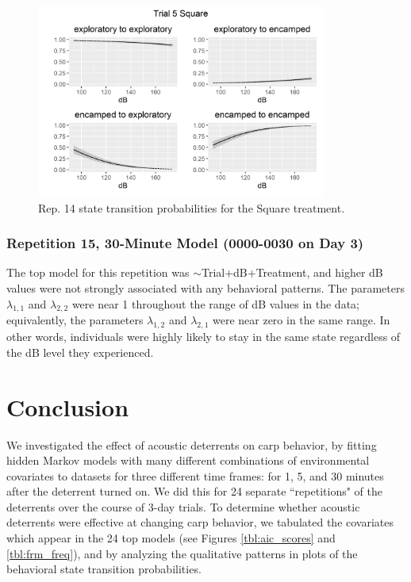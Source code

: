 \documentclass[12pt]{article}
\begin{document}
			\begin{figure}
				\centering
				\includegraphics[width=0.85\textwidth]{trans_rep_14_trial_5_Square.png}
				\caption{Rep. 14 state transition probabilities for the Square treatment.}
				\label{img:rep5_30min_trans_tmnt}
			\end{figure}
		
		\subsubsection{Repetition 15, 30-Minute Model (0000-0030 on Day 3)}
		
		The top model for this repetition was $\sim$Trial+dB+Treatment, and higher dB values were not strongly associated with any behavioral patterns. The parameters $\lambda_{1, 1}$ and $\lambda_{2, 2}$ were near 1 throughout the range of dB values in the data; equivalently, the parameters $\lambda_{1, 2}$ and $\lambda_{2, 1}$ were near zero in the same range. In other words, individuals were highly likely to stay in the same state regardless of the dB level they experienced.

\section{Conclusion}

	We investigated the effect of acoustic deterrents on carp behavior, by fitting hidden Markov models with many different combinations of environmental covariates to datasets for three different time frames: for 1, 5, and 30 minutes after the deterrent turned on. We did this for 24 separate ``repetitions" of the deterrents over the course of 3-day trials. To determine whether acoustic deterrents were effective at changing carp behavior, we tabulated the covariates which appear in the 24 top models (see Figures \ref{tbl:aic_scores} and \ref{tbl:frm_freq}), and by analyzing the qualitative patterns in plots of the behavioral state transition probabilities.
	
\end{document}

